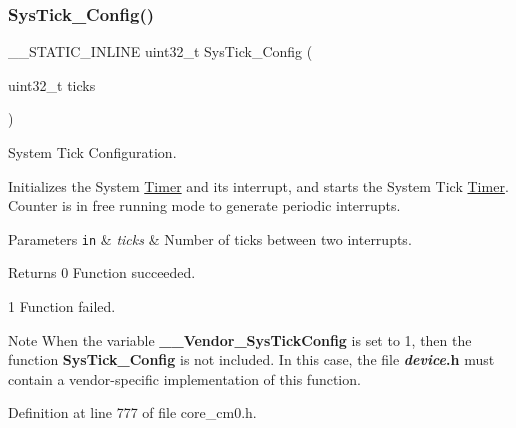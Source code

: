 \subsubsection{\texorpdfstring{Sys\+Tick\+\_\+\+Config()}{SysTick\_Config()}}
{\footnotesize\ttfamily \+\_\+\+\_\+\+S\+T\+A\+T\+I\+C\+\_\+\+I\+N\+L\+I\+NE uint32\+\_\+t Sys\+Tick\+\_\+\+Config (\begin{DoxyParamCaption}\item[{uint32\+\_\+t}]{ticks }\end{DoxyParamCaption})}



System Tick Configuration. 

Initializes the System \hyperlink{class_timer}{Timer} and its interrupt, and starts the System Tick \hyperlink{class_timer}{Timer}. Counter is in free running mode to generate periodic interrupts. 
\begin{DoxyParams}[1]{Parameters}
\mbox{\tt in}  & {\em ticks} & Number of ticks between two interrupts. \\
\hline
\end{DoxyParams}
\begin{DoxyReturn}{Returns}
0 Function succeeded. 

1 Function failed. 
\end{DoxyReturn}
\begin{DoxyNote}{Note}
When the variable {\bfseries \+\_\+\+\_\+\+Vendor\+\_\+\+Sys\+Tick\+Config} is set to 1, then the function {\bfseries Sys\+Tick\+\_\+\+Config} is not included. In this case, the file {\bfseries {\itshape device}.h} must contain a vendor-\/specific implementation of this function. 
\end{DoxyNote}


Definition at line 777 of file core\+\_\+cm0.\+h.

